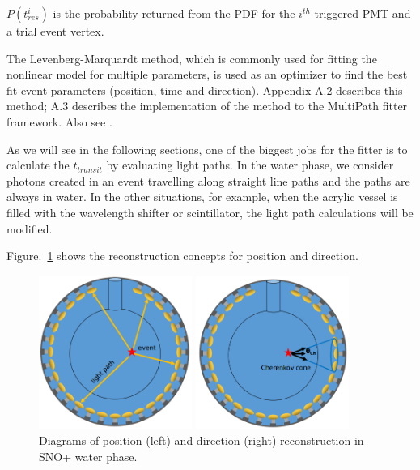 $P(t^i_{res})$ is the probability returned from the PDF for the $i^{th}$ triggered PMT and a trial event
vertex.

The Levenberg-Marquardt method, which is commonly used for fitting the nonlinear model for multiple parameters, is used as an optimizer to find the best fit event parameters (position, time and direction). Appendix A.2 describes this method; A.3 describes the implementation of the method to the MultiPath fitter framework. Also see \cite{gregory2005bayesian, press2007numerical}.


As we will see in the following sections, one of the biggest jobs for the fitter is to calculate the $t_{transit}$ by evaluating light paths. In the water phase, we consider photons created in an event travelling along straight line paths and the paths are always in water. In the other situations, for example, when the acrylic vessel is filled with the wavelength shifter or scintillator, the light path calculations will be modified.   

Figure.~\ref{mpwdiagram} shows the reconstruction concepts for position and direction.
\begin{figure}[htbp]
	\centering
	\begin{minipage}[t]{0.45\textwidth}
		\centering
		\includegraphics[width=5cm]{mpwDiagram.png}
	\end{minipage}
	\begin{minipage}[t]{0.4\textwidth}
		\centering
		\includegraphics[width=5cm]{mpwDiagram2.png}
	\end{minipage}
	\caption{Diagrams of position (left) and direction (right) reconstruction in SNO+ water phase.}
	\label{mpwdiagram}
\end{figure}


